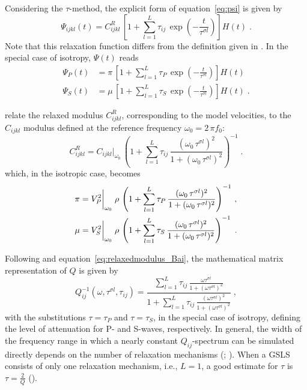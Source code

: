 Considering the $\tau$-method, the explicit form of equation~\ref{eq:psi} is given by
\begin{equation}
    \Psi_{ijkl}(t) = C_{ijkl}^R\,\left[1+\sum_{l=1}^{L}\tau_{ij}\,\exp\left(-\frac{t}{\tau^{\sigma l}}\right) \right] H(t)\;.
    \label{eq:psi_2.0}
\end{equation}
Note that this relaxation function differs from the definition given in \citet{Bai:16}. In the special case of isotropy, $\Psi(t)$ reads  
\begin{subequations}
    \begin{align}
    \Psi_P(t) &= \pi\,\left[1+\sum_{l=1}^{L}\tau_P\,\exp\left(-\frac{t}{\tau^{\sigma l}}\right)\right]H(t)\;\\
    \Psi_S(t) &= \mu\,\left[1+\sum_{l=1}^{L}\tau_S\,\exp\left(-\frac{t}{\tau^{\sigma l}}\right)\right]H(t)\;.
    \end{align}
\end{subequations}

\citet{Bai:16} relate the relaxed modulus $C_{ijkl}^R$, corresponding to the model velocities, to the $C_{ijkl}$ modulus defined at the reference frequency $\omega_0 = 2\,\pi f_0$:
\begin{equation}
    C_{ijkl}^R = C_{ijkl}\bigg|_{\omega_0}\,\left(1+\sum_{l=1}^{L}\tau_{ij}\,\frac{(\omega_0\,\tau^{\sigma l})^2}{1+(\omega_0\,\tau^{\sigma l})^2} \right)^{-1}\;.
    \label{eq:relaxedmodulus_Bai}
\end{equation}
which, in the isotropic case, becomes
\begin{subequations}
\allowdisplaybreaks
\begin{align}
    \pi &= V_P^2\bigg|_{\omega_0}\;\rho\,\left(1+\sum_{l=1}^{L}\tau_P\,\frac{(\omega_0\,\tau^{\sigma l})^2}{1+(\omega_0\,\tau^{\sigma l})^2}\right)^{-1}\,,\\
    \mu &= V_S^2\bigg|_{\omega_0}\;\rho\,\left(1+\sum_{l=1}^{L}\tau_S\,\frac{(\omega_0\,\tau^{\sigma l})^2}{1+(\omega_0\,\tau^{\sigma l})^2}\right)^{-1}\;.
\end{align}
\end{subequations}

Following \citet{Zhu:06} and equation~\ref{eq:relaxedmodulus_Bai}, the mathematical matrix representation of $Q$ is given by 
\enlargethispage{\baselineskip}
\begin{equation}
    Q_{ij}^{-1}(\omega,\tau^{\sigma l},\tau_{ij}) = \frac{\sum_{l=1}^{L}\tau_{ij}\,\frac{\omega\tau^{\sigma l}}{1+(\omega\tau^{\sigma l})^2}}{1+\sum_{l=1}^{L}\tau_{ij}\,\frac{(\omega\tau^{\sigma l})^2}{1+(\omega\tau^{\sigma l})^2}}\;,
    \label{eq:Qinverse}
\end{equation}
with the substitutions $\tau = \tau_P$ and $\tau = \tau_S$, in the special case of isotropy, defining the level of attenuation for P- and S-waves, respectively. In general, the width of the frequency range in which a nearly constant $Q_{ij}$-spectrum can be simulated directly depends on the number of relaxation mechanisms (\cite{Bai:16}; \cite{Komatitisch:99}). When a GSLS consists of only one relaxation mechanism, i.e., $L=1$, a good estimate for $\tau$ is $\tau = \frac{2}{Q}$ (\cite{bohlen:02}).

